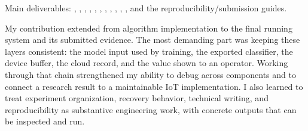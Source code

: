 \documentclass[conference,a4paper]{IEEEtran}
\newenvironment{evidence}{\par\smallskip\begingroup\footnotesize\raggedright\noindent}{\par\endgroup}
\begin{document}
\begin{evidence}
Main deliverables: , , , , , , , , , , , and the reproducibility/submission guides.
\end{evidence}

My contribution extended from algorithm implementation to the final running system and its submitted evidence. The most demanding part was keeping these layers consistent: the model input used by training, the exported classifier, the device buffer, the cloud record, and the value shown to an operator. Working through that chain strengthened my ability to debug across components and to connect a research result to a maintainable IoT implementation. I also learned to treat experiment organization, recovery behavior, technical writing, and reproducibility as substantive engineering work, with concrete outputs that can be inspected and run.
\end{document}
